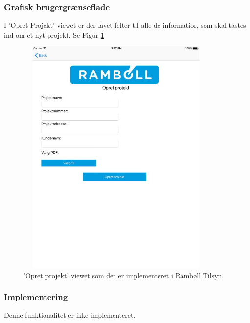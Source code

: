 \subsubsection{Grafisk brugergrænseflade}
I 'Opret  Projekt' viewet er der lavet felter til alle de informatior, som skal tastes ind om et nyt projekt. Se Figur \ref{fig:OpretProjektView}
\begin{figure}[H] %
	\centering
	\includegraphics[height=12cm, width=10cm]{../ArkitekturDesign/Design/OpretProjekt/OpretProjektView}
	\caption{'Opret projekt' viewet som det er implementeret i Rambøll Tilsyn.}
	\label{fig:OpretProjektView}
\end{figure}

\subsubsection{Implementering}
Denne funktionalitet er ikke implementeret.

\clearpage